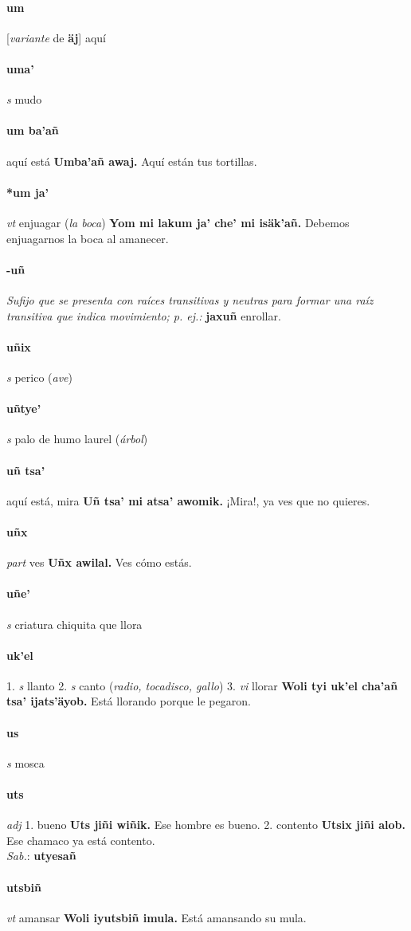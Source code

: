 \documentclass{scrbook}
\newcommand{\entry}[1]{\paragraph{#1}}
\newcommand{\onedefinition}[1]{#1.}
\newcommand{\nontranslationdef}[1]{\textit{#1}}
\newcommand{\partofspeech}[1]{\textit{#1}}
\newcommand{\spanishtranslation}[1]{#1}
\newcommand{\clarification}[1]{(\textit{#1})}
\newcommand{\cholexample}[1]{\textbf{#1}}
\newcommand{\exampletranslation}[1]{#1}
\newcommand{\dialectvariant}[1]{\\\textit{#1}:}
\newcommand{\dialectword}[1]{\textbf{#1}}
\newcommand{\conjugationtense}[1]{[\textit{#1}}
\newcommand{\conjugationverb}[1]{de \textbf{#1}]}
\begin{document}
\begin{multicols}{2}
\entry{um}
\conjugationtense{variante}
\conjugationverb{äj}
\spanishtranslation{aquí}

\entry{uma'}
\partofspeech{s}
\spanishtranslation{mudo}

\entry{um ba'añ}
\spanishtranslation{aquí está}
\cholexample{Umba'añ awaj.}
\exampletranslation{Aquí están tus tortillas.}

\entry{*um ja'}
\partofspeech{vt}
\spanishtranslation{enjuagar}
\clarification{la boca}
\cholexample{Yom mi lakum ja' che' mi isäk'añ.}
\exampletranslation{Debemos enjuagarnos la boca al amanecer.}

\entry{-uñ}
\nontranslationdef{Sufijo que se presenta con raíces transitivas y neutras para formar una raíz transitiva que indica movimiento; p. ej.:}
\cholexample{jaxuñ}
\exampletranslation{enrollar.}

\entry{uñix}
\partofspeech{s}
\spanishtranslation{perico}
\clarification{ave}

\entry{uñtye'}
\partofspeech{s}
\spanishtranslation{palo de humo}
\spanishtranslation{laurel}
\clarification{árbol}

\entry{uñ tsa'}
\spanishtranslation{aquí está, mira}
\cholexample{Uñ tsa' mi atsa' awomik.}
\exampletranslation{¡Mira!, ya ves que no quieres.}

\entry{uñx}
\partofspeech{part}
\spanishtranslation{ves}
\cholexample{Uñx awilal.}
\exampletranslation{Ves cómo estás.}

\entry{uñe'}
\partofspeech{s}
\spanishtranslation{criatura chiquita que llora}

\entry{uk'el}
\onedefinition{1}
\partofspeech{s}
\spanishtranslation{llanto}
\onedefinition{2}
\partofspeech{s}
\spanishtranslation{canto}
\clarification{radio, tocadisco, gallo}
\onedefinition{3}
\partofspeech{vi}
\spanishtranslation{llorar}
\cholexample{Woli tyi uk'el cha'añ tsa' ijats'äyob.}
\exampletranslation{Está llorando porque le pegaron.}

\entry{us}
\partofspeech{s}
\spanishtranslation{mosca}

\entry{uts}
\partofspeech{adj}
\onedefinition{1}
\spanishtranslation{bueno}
\cholexample{Uts jiñi wiñik.}
\exampletranslation{Ese hombre es bueno.}
\onedefinition{2}
\spanishtranslation{contento}
\cholexample{Utsix jiñi alob.}
\exampletranslation{Ese chamaco ya está contento.}
\dialectvariant{Sab.}
\dialectword{utyesañ}

\entry{utsbiñ}
\partofspeech{vt}
\spanishtranslation{amansar}
\cholexample{Woli iyutsbiñ imula.}
\exampletranslation{Está amansando su mula.}


\end{multicols}
\end{document}
